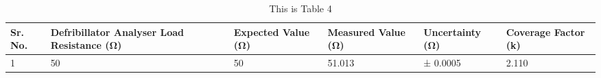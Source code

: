 \vspace{5mm}
\begin{table}
\caption{This is Table 4}
\begin{tabular}{|p{2.6666666666666665 cm}|p{2.6666666666666665 cm}|p{2.6666666666666665 cm}|p{2.6666666666666665 cm}|p{2.6666666666666665 cm}|p{2.6666666666666665 cm}|}
\toprule
Sr. No. & Defribillator Analyser Load Resistance (Ω) & Expected Value (Ω) & Measured Value (Ω) & Uncertainty (Ω) & Coverage Factor (k) \\
\midrule
1 & 50 & 50 & 51.013 &  ± 0.0005 & 2.110 \\
\bottomrule
\end{tabular}
\end{table}
\vspace{5mm}
